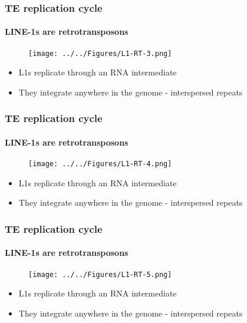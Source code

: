 \documentclass{beamer}
\begin{document}
		\begin{frame} %
			
			\frametitle{TE replication cycle}
			\framesubtitle{LINE-1s are retrotransposons}
			
			\begin{figure}
				\texttt{[image: ../../Figures/L1-RT-3.png]}
			\end{figure}
			\begin{itemize}
				\item L1s replicate through an RNA intermediate
				\item They integrate anywhere in the genome - interspersed repeats
			\end{itemize}
			
		\end{frame}
		
		\begin{frame} %
			
			\frametitle{TE replication cycle}
			\framesubtitle{LINE-1s are retrotransposons}
			
			\begin{figure}
				\texttt{[image: ../../Figures/L1-RT-4.png]}
			\end{figure}
			\begin{itemize}
				\item L1s replicate through an RNA intermediate
				\item They integrate anywhere in the genome - interspersed repeats
			\end{itemize}
			
		\end{frame}
		
		\begin{frame} %
			
			\frametitle{TE replication cycle}
			\framesubtitle{LINE-1s are retrotransposons}
			
			\begin{figure}
				\texttt{[image: ../../Figures/L1-RT-5.png]}
			\end{figure}
			\begin{itemize}
				\item L1s replicate through an RNA intermediate
				\item They integrate anywhere in the genome - interspersed repeats
			\end{itemize}
			
		\end{frame}
		
\end{document}
